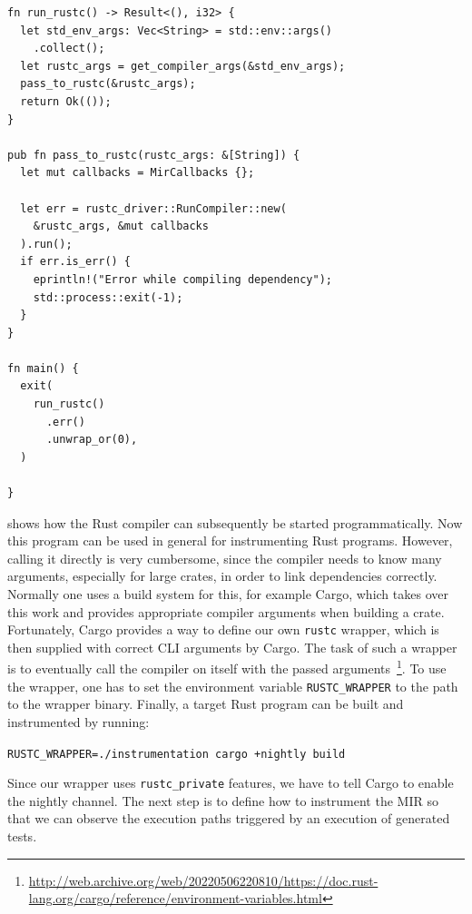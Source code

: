 \documentclass[paper=a4,%
  twoside,%
  BCOR4mm,%
  abstract=true,%
  toc=bibliography,%
  chapterprefix=true,%
  toc=bibliographynumbered,%
  open=right,%
  english,%
  pagesize=pdftex]{scrreprt}
\newcommand{\hir}{\ac{HIR}\xspace}
\newcommand{\mir}{\ac{MIR}\xspace}
\begin{document}
\begin{lstlisting}[style=boxed, caption={Running the Rust compiler like a library}, label=lst:running-compiler]
fn run_rustc() -> Result<(), i32> {
  let std_env_args: Vec<String> = std::env::args()
    .collect();
  let rustc_args = get_compiler_args(&std_env_args);
  pass_to_rustc(&rustc_args);
  return Ok(());
}

pub fn pass_to_rustc(rustc_args: &[String]) {
  let mut callbacks = MirCallbacks {};

  let err = rustc_driver::RunCompiler::new(
    &rustc_args, &mut callbacks
  ).run();
  if err.is_err() {
    eprintln!("Error while compiling dependency");
    std::process::exit(-1);
  }
}

fn main() {
  exit(
    run_rustc()
      .err()
      .unwrap_or(0),
  )

}
\end{lstlisting}

 shows how the Rust compiler can subsequently be started programmatically. Now this program can be used in general for instrumenting Rust programs. However, calling it directly is very cumbersome, since the compiler needs to know many arguments, especially for large crates, in order to link dependencies correctly. Normally one uses a build system for this, for example Cargo, which takes over this work and provides appropriate compiler arguments when building a crate. Fortunately, Cargo provides a way to define our own \texttt{rustc} wrapper, which is then supplied with correct CLI arguments by Cargo. The task of such a wrapper is to eventually call the compiler on itself with the passed arguments~\footnote{\url{http://web.archive.org/web/20220506220810/https://doc.rust-lang.org/cargo/reference/environment-variables.html}}. To use the wrapper, one has to set the environment variable \texttt{RUSTC\string_WRAPPER} to the path to the wrapper binary. Finally, a target Rust program can be built and instrumented by running:

\texttt{RUSTC\string_WRAPPER=./instrumentation cargo \string+nightly build}

Since our wrapper uses \texttt{rustc\string_private} features, we have to tell Cargo to enable the nightly channel. The next step is to define how to instrument the \mir so that we can observe the execution paths triggered by an execution of generated tests.

\end{document}
